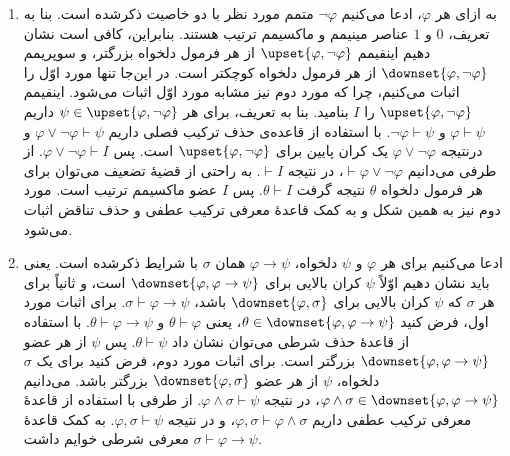 \begin{ans}
\begin{enumerate}[label=(\alph*)]
        \item\label{q60:e}
        به ازای هر $\varphi$، ادعا می‌کنیم $\neg \varphi$ متمم مورد نظر با دو خاصیت ذکرشده است. بنا به تعریف، $0$ و $1$ عناصر مینیمم و ماکسیمم ترتیب هستند. بنابراین، کافی است نشان دهیم اینفیمم $\upset\{\varphi, \neg\varphi\}$ از هر فرمول دلخواه بزرگتر، و سوپریمم $\downset\{\varphi, \neg\varphi\}$ از هر فرمول دلخواه کوچکتر است. در این‌جا تنها مورد اوّل را اثبات می‌کنیم، چرا که مورد دوم نیز مشابه مورد اوّل اثبات می‌شود. 
        اینفیمم $\upset\{\varphi, \neg\varphi\}$ را $I$ بنامید. بنا به تعریف، برای هر $\psi \in \upset\{\varphi, \neg\varphi\}$ داریم $\varphi \vdash \psi$ و $\neg\varphi \vdash \psi$. با استفاده از قاعده‌ی حذف ترکیب فصلی داریم $\varphi \vee \neg\varphi \vdash \psi$ و درنتیجه $\varphi \vee \neg\varphi$ یک کران پایین برای $\upset\{\varphi, \neg\varphi\}$ است. پس $\varphi \vee \neg\varphi \vdash I$. از طرفی می‌دانیم $\vdash \varphi \vee \neg\varphi$، در نتیجه $\vdash I$. به راحتی از قضیهٔ تضعیف می‌توان برای هر فرمول دلخواه $\theta$ نتیجه گرفت $\theta \vdash I$. پس $I$ عضو ماکسیمم ترتیب است. مورد دوم نیز به همین شکل و به کمک قاعدهٔ معرفی ترکیب عطفی و حذف تناقض اثبات می‌شود.

        \item\label{q60:f}
        ادعا می‌کنیم برای هر $\varphi$ و $\psi$ دلخواه، $\varphi \rightarrow \psi$ همان $\sigma$ با شرایط ذکرشده است. یعنی باید نشان دهیم اوّلاً $\psi$ کران بالایی برای $\downset\{\varphi, \varphi \rightarrow \psi\}$ است، و ثانیاً برای هر $\sigma$ که $\psi$ کران بالایی برای $\downset\{\varphi, \sigma\}$ باشد، $\sigma \vdash \varphi \rightarrow \psi$. برای اثبات مورد اول، فرض کنید $\theta \in \downset\{\varphi, \varphi \rightarrow \psi\}$، یعنی $\theta \vdash \varphi$ و $\theta \vdash \varphi \rightarrow \psi$. با استفاده از قاعدهٔ حذف شرطی می‌توان نشان داد $\theta \vdash \psi$. پس $\psi$ از هر عضو $\downset\{\varphi, \varphi \rightarrow \psi\}$ بزرگتر است. برای اثبات مورد دوم، فرض کنید برای یک $\sigma$ دلخواه، $\psi$ از هر عضو $\downset\{\varphi, \sigma\}$ بزرگتر باشد. می‌دانیم $\varphi \wedge \sigma \in \downset\{\varphi, \varphi \rightarrow \psi\}$، در نتیجه $\varphi \wedge \sigma \vdash \psi$. از طرفی با استفاده از قاعدهٔ معرفی ترکیب عطفی داریم $\varphi, \sigma \vdash \varphi \wedge \sigma$، و در نتیجه $\varphi, \sigma \vdash \psi$. به کمک قاعدهٔ معرفی شرطی خوایم داشت $\sigma \vdash \varphi \rightarrow \psi$.
    \end{enumerate}
\end{ans}
